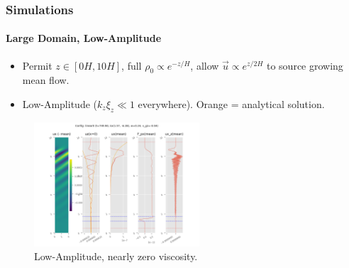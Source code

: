\documentclass[dvipsnames, 10pt]{beamer}
\begin{document}
\begin{frame}
    \frametitle{Simulations}
    \framesubtitle{Large Domain, Low-Amplitude}

    \begin{itemize}
        \item Permit $z \in [0H, 10H]$, full $\rho_0 \propto e^{-z/H}$, allow
            $\vec{u} \propto e^{z/2H}$ to source growing mean flow.

        \item Low-Amplitude ($k_z\xi_z \ll 1$ everywhere). Orange = analytical
            solution.
    \end{itemize}
    \begin{figure}[t]
        \centering
        \includegraphics[width=0.55\textwidth]{lin_nonu.png}
        \caption{Low-Amplitude, nearly zero viscosity.}
    \end{figure}
\end{frame}
\end{document}
